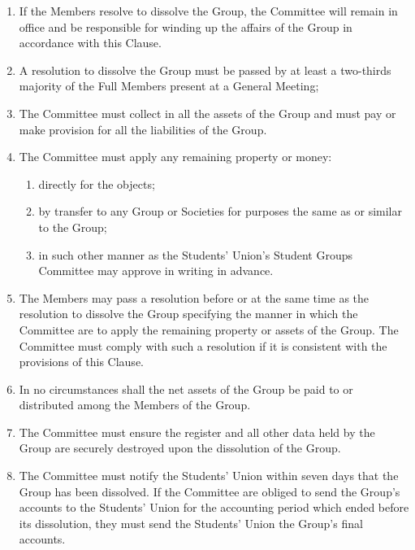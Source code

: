 \documentclass[12pt]{constitution}
\begin{document}
\begin{enumerate}
    \item If the Members resolve to dissolve the Group, the Committee will remain in office and be responsible for winding up the affairs of the Group in accordance with this Clause.
    \item A resolution to dissolve the Group must be passed by at least a two-thirds majority of the Full Members present at a General Meeting;
    \item The Committee must collect in all the assets of the Group and must pay or make provision for all the liabilities of the Group.
    \item The Committee must apply any remaining property or money:
    \begin{enumerate}
        \item directly for the objects;
        \item by transfer to any Group or Societies for purposes the same as or similar to the Group;
        \item in such other manner as the Students' Union's Student Groups Committee may approve in writing in advance.
    \end{enumerate}

    \item The Members may pass a resolution before or at the same time as the resolution to dissolve the Group specifying the manner in which the Committee are to apply the remaining property or assets of the Group.  The Committee must comply with such a resolution if it is consistent with the provisions of this Clause.
    \item In no circumstances shall the net assets of the Group be paid to or distributed among the Members of the Group.
    \item The Committee must ensure the register and all other data held by the Group are securely destroyed upon the dissolution of the Group.
    \item The Committee must notify the Students' Union within seven days that the Group has been dissolved.  If the Committee are obliged to send the Group's accounts to the Students' Union for the accounting period which ended before its dissolution, they must send the Students' Union the Group's final accounts.
\end{enumerate}


\label{clause:interpretation}
\end{document}
